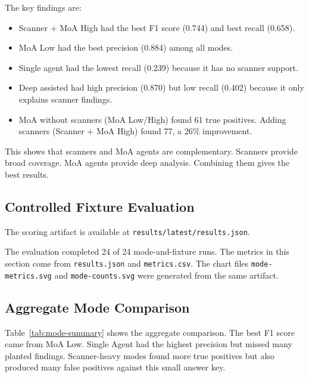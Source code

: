 \documentclass[sigconf,nonacm]{acmart}
\newcommand{\LatestResultsPath}{\texttt{results/latest/results.json}}
\begin{document}
The key findings are:

\begin{itemize}
  \item Scanner + MoA High had the best F1 score (0.744) and best recall (0.658).
  \item MoA Low had the best precision (0.884) among all modes.
  \item Single agent had the lowest recall (0.239) because it has no scanner support.
  \item Deep assisted had high precision (0.870) but low recall (0.402) because it only explains scanner findings.
  \item MoA without scanners (MoA Low/High) found 61 true positives. Adding scanners (Scanner + MoA High) found 77, a 26\% improvement.
\end{itemize}

This shows that scanners and MoA agents are complementary. Scanners provide broad coverage. MoA agents provide deep analysis. Combining them gives the best results.

\subsection{Controlled Fixture Evaluation}
The scoring artifact is available at \LatestResultsPath.

The evaluation completed 24 of 24 mode-and-fixture runs. The metrics in this section come from \texttt{results.json} and \texttt{metrics.csv}. The chart files \texttt{mode-metrics.svg} and \texttt{mode-counts.svg} were generated from the same artifact.

\subsection{Aggregate Mode Comparison}
Table~\ref{tab:mode-summary} shows the aggregate comparison. The best F1 score came from MoA Low. Single Agent had the highest precision but missed many planted findings. Scanner-heavy modes found more true positives but also produced many false positives against this small answer key.
\end{document}
